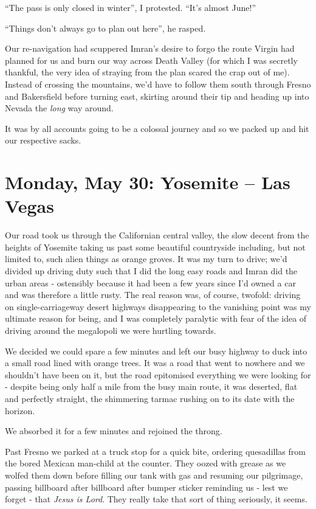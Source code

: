 \documentclass[a5paper,10pt,titlepage,draft]{book}
\begin{document}
``The pass is only closed in winter'', I protested.  ``It's almost June!''

``Things don't always go to plan out here'', he rasped.

Our re-navigation had scuppered Imran's desire to forgo the route Virgin had planned for us and burn our way across Death Valley (for which I was secretly thankful, the very idea of straying from the plan scared the crap out of me).  Instead of crossing the mountains, we'd have to follow them south through Fresno and Bakersfield before turning east, skirting around their tip and heading up into Nevada the \emph{long} way around.

It was by all accounts going to be a colossal journey and so we packed up and hit our respective sacks.

\chapter[Yosemite -- Las Vegas]{Monday, May 30: Yosemite -- Las Vegas}
Our road took us through the Californian central valley, the slow decent from the heights of Yosemite taking us past some beautiful countryside including, but not limited to, such alien things as orange groves.  It was my turn to drive; we'd divided up driving duty such that I did the long easy roads and Imran did the urban areas - ostensibly because it had been a few years since I'd owned a car and was therefore a little rusty.  The real reason was, of course, twofold: driving on single-carriageway desert highways disappearing to the vanishing point was my ultimate reason for being, and I was completely paralytic with fear of the idea of driving around the megalopoli we were hurtling towards.

We decided we could spare a few minutes and left our busy highway to duck into a small road lined with orange trees.  It was a road that went to nowhere and we shouldn't have been on it, but the road epitomised everything we were looking for - despite being only half a mile from the busy main route, it was deserted, flat and perfectly straight, the shimmering tarmac rushing on to its date with the horizon.

We absorbed it for a few minutes and rejoined the throng.

Past Fresno we parked at a truck stop for a quick bite, ordering quesadillas from the bored Mexican man-child at the counter.  They oozed with grease as we wolfed them down before filling our tank with gas and resuming our pilgrimage, passing billboard after billboard after bumper sticker reminding us - lest we forget - that \emph{Jesus is Lord}.  They really take that sort of thing seriously, it seems.
\end{document}
